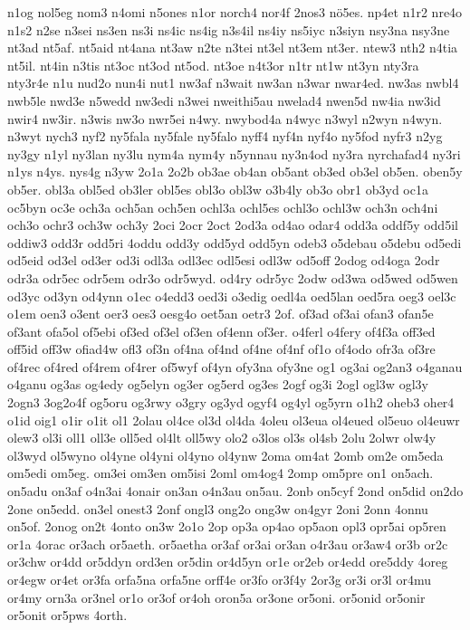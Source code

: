 {n1og
nol5eg
nom3
n4omi
n5ones
n1or
norch4
nor4f
2nos3
nö5es.
np4et
n1r2
nre4o
n1s2
n2se
n3sei
ns3en
ns3i
ns4ic
ns4ig
n3s4il
ns4iy
ns5iyc
n3siyn
nsy3na
nsy3ne
nt3ad
nt5af.
nt5aid
nt4ana
nt3aw
n2te
n3tei
nt3el
nt3em
nt3er.
ntew3
nth2
n4tia
nt5il.
nt4in
n3tis
nt3oc
nt3od
nt5od.
nt3oe
n4t3or
n1tr
nt1w
nt3yn
nty3ra
nty3r4e
n1u
nud2o
nun4i
nut1
nw3af
n3wait
nw3an
n3war
nwar4ed.
nw3as
nwbl4
nwb5le
nwd3e
n5wedd
nw3edi
n3wei
nweithi5au
nwelad4
nwen5d
nw4ia
nw3id
nwir4
nw3ir.
n3wis
nw3o
nwr5ei
n4wy.
nwybod4a
n4wyc
n3wyl
n2wyn
n4wyn.
n3wyt
nych3
nyf2
ny5fala
ny5fale
ny5falo
nyff4
nyf4n
nyf4o
ny5fod
nyfr3
n2yg
ny3gy
n1yl
ny3lan
ny3lu
nym4a
nym4y
n5ynnau
ny3n4od
ny3ra
nyrchafad4
ny3ri
n1ys
n4ys.
nys4g
n3yw
2o1a
2o2b
ob3ae
ob4an
ob5ant
ob3ed
ob3el
ob5en.
oben5y
ob5er.
obl3a
obl5ed
ob3ler
obl5es
obl3o
obl3w
o3b4ly
ob3o
obr1
ob3yd
oc1a
oc5byn
oc3e
och3a
och5an
och5en
ochl3a
ochl5es
ochl3o
ochl3w
och3n
och4ni
och3o
ochr3
och3w
och3y
2oci
2ocr
2oct
2od3a
od4ao
odar4
odd3a
oddf5y
odd5il
oddiw3
odd3r
odd5ri
4oddu
odd3y
odd5yd
odd5yn
odeb3
o5debau
o5debu
od5edi
od5eid
od3el
od3er
od3i
odl3a
odl3ec
odl5esi
odl3w
od5off
2odog
od4oga
2odr
odr3a
odr5ec
odr5em
odr3o
odr5wyd.
od4ry
odr5yc
2odw
od3wa
od5wed
od5wen
od3yc
od3yn
od4ynn
o1ec
o4edd3
oed3i
o3edig
oedl4a
oed5lan
oed5ra
oeg3
oel3c
o1em
oen3
o3ent
oer3
oes3
oesg4o
oet5an
oetr3
2of.
of3ad
of3ai
ofan3
ofan5e
of3ant
ofa5ol
of5ebi
of3ed
of3el
of3en
of4enn
of3er.
o4ferl
o4fery
of4f3a
off3ed
off5id
off3w
ofiad4w
ofl3
of3n
of4na
of4nd
of4ne
of4nf
of1o
of4odo
ofr3a
of3re
of4rec
of4red
of4rem
of4rer
of5wyf
of4yn
ofy3na
ofy3ne
og1
og3ai
og2an3
o4ganau
o4ganu
og3as
og4edy
og5elyn
og3er
og5erd
og3es
2ogf
og3i
2ogl
ogl3w
ogl3y
2ogn3
3og2o4f
og5oru
og3rwy
o3gry
og3yd
ogyf4
og4yl
og5yrn
o1h2
oheb3
oher4
o1id
oig1
o1ir
o1it
ol1
2olau
ol4ce
ol3d
ol4da
4oleu
ol3eua
ol4eued
ol5euo
ol4euwr
olew3
ol3i
oll1
oll3e
oll5ed
ol4lt
oll5wy
olo2
o3los
ol3s
ol4sb
2olu
2olwr
olw4y
ol3wyd
ol5wyno
ol4yne
ol4yni
ol4yno
ol4ynw
2oma
om4at
2omb
om2e
om5eda
om5edi
om5eg.
om3ei
om3en
om5isi
2oml
om4og4
2omp
om5pre
on1
on5ach.
on5adu
on3af
o4n3ai
4onair
on3an
o4n3au
on5au.
2onb
on5cyf
2ond
on5did
on2do
2one
on5edd.
on3el
onest3
2onf
ongl3
ong2o
ong3w
on4gyr
2oni
2onn
4onnu
on5of.
2onog
on2t
4onto
on3w
2o1o
2op
op3a
op4ao
op5aon
opl3
opr5ai
op5ren
or1a
4orac
or3ach
or5aeth.
or5aetha
or3af
or3ai
or3an
o4r3au
or3aw4
or3b
or2c
or3chw
or4dd
or5ddyn
ord3en
or5din
or4d5yn
or1e
or2eb
or4edd
ore5ddy
4oreg
or4egw
or4et
or3fa
orfa5na
orfa5ne
orff4e
or3fo
or3f4y
2or3g
or3i
or3l
or4mu
or4my
orn3a
or3nel
or1o
or3of
or4oh
oron5a
or3one
or5oni.
or5onid
or5onir
or5onit
or5pws
4orth.
}
